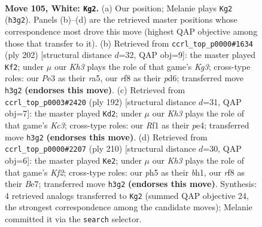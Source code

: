 \documentclass[11pt]{article}
\begin{document}
\clearpage

\begin{figure}[p]\centering
\begin{subfigure}{0.46\textwidth}\centering
\resizebox{\linewidth}{!}{%
\newchessgame
\chessboard[
  setfen={5r2/2k5/p7/P1p2p1p/1p3P1P/4P1PK/1P6/5R2 w - - 21 105},
  showmover=false,
  pgfstyle=straightmove, color=movearrow, markmove={h3-g2}
]}
\caption{}
\end{subfigure}\hfill
\begin{subfigure}{0.46\textwidth}\centering
\resizebox{\linewidth}{!}{%
\newchessgame
\chessboard[
  setfen={8/2p5/3p2pk/r2Pp1p1/2P1P3/5PKP/1R6/8 w - - 21 102},
  showmover=false,
  pgfstyle=straightmove, color=movearrow, markmove={g3-f2}
]}
\caption{}
\end{subfigure}
\\[4pt]
\begin{subfigure}{0.46\textwidth}\centering
\resizebox{\linewidth}{!}{%
\newchessgame
\chessboard[
  setfen={8/8/1p2k3/1P3p1p/3Pp1pP/2K1P1P1/5P2/8 w - - 18 97},
  showmover=false,
  pgfstyle=straightmove, color=movearrow, markmove={c3-d2}
]}
\caption{}
\end{subfigure}\hfill
\begin{subfigure}{0.46\textwidth}\centering
\resizebox{\linewidth}{!}{%
\newchessgame
\chessboard[
  setfen={8/4Bp1p/4p3/4PpP1/p4P2/P5P1/2k2K2/7b w - - 92 106},
  showmover=false,
  pgfstyle=straightmove, color=movearrow, markmove={f2-e2}
]}
\caption{}
\end{subfigure}
\caption{\textbf{Move 105, White: \texttt{Kg2}.} (a) Our position; Melanie plays \texttt{Kg2} (\texttt{h3g2}). Panels (b)--(d) are the retrieved master positions whose correspondence most drove this move (highest QAP objective among those that transfer to it). (b) Retrieved from \texttt{ccrl\_top\_p0000\#1634} (ply 202) [structural distance $d$=32, QAP obj=9]: the master played \texttt{Kf2}; under $\mu$ our \emph{Kh3} plays the role of that game's \emph{Kg3}; cross-type roles: our \emph{P}e3 as their \emph{r}a5, our \emph{r}f8 as their \emph{p}d6; transferred move \texttt{h3g2} \textbf{(endorses this move)}. (c) Retrieved from \texttt{ccrl\_top\_p0003\#2420} (ply 192) [structural distance $d$=31, QAP obj=7]: the master played \texttt{Kd2}; under $\mu$ our \emph{Kh3} plays the role of that game's \emph{Kc3}; cross-type roles: our \emph{R}f1 as their \emph{p}e4; transferred move \texttt{h3g2} \textbf{(endorses this move)}. (d) Retrieved from \texttt{ccrl\_top\_p0000\#2207} (ply 210) [structural distance $d$=30, QAP obj=6]: the master played \texttt{Ke2}; under $\mu$ our \emph{Kh3} plays the role of that game's \emph{Kf2}; cross-type roles: our \emph{p}h5 as their \emph{b}h1, our \emph{r}f8 as their \emph{B}e7; transferred move \texttt{h3g2} \textbf{(endorses this move)}. Synthesis: 4 retrieved analogs transferred to \texttt{Kg2} (summed QAP objective 24, the strongest correspondence among the candidate moves); Melanie committed it via the \texttt{search} selector.}
\label{fig:thought-m208}
\end{figure}
\end{document}
